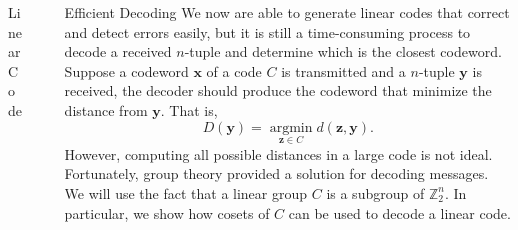 \documentclass[final]{beamer}
\newcommand{\Z}{\mathbb{Z}}
\newlength{\sepwidth}
\newlength{\colwidth}
\newcommand{\separatorcolumn}{\begin{column}{\sepwidth}\end{column}}
\begin{document}
\begin{frame}[t]
\begin{columns}[t]
\begin{column}{\colwidth}
\begin{block}{Linear Code}
  \end{block}

\end{column}

\separatorcolumn

\begin{column}{\colwidth}

  \begin{block}{Efficient Decoding}
    We now are able to generate linear codes that correct and detect errors easily, but it is still a time-consuming process to decode a received $n$-tuple and determine which is the closest codeword. Suppose a codeword $\textbf{x}$ of a code $C$ is transmitted and a $n$-tuple $\textbf{y}$ is received, the decoder should produce the codeword that minimize the distance from $\textbf{y}$. That is, $$D(\textbf{y}) = \operatorname*{argmin}_{\textbf{z} \in C} d(\textbf{z}, \textbf{y}).$$ However, computing all possible distances in a large code is not ideal. Fortunately, group theory provided a solution for decoding messages. We will use the fact that a linear group $C$ is a subgroup of $\Z_2^n$. In particular, we show how cosets of $C$ can be used to decode a linear code. 

    \vspace{4mm}


\end{block}
\end{column}
\end{columns}
\end{frame}
\end{document}
